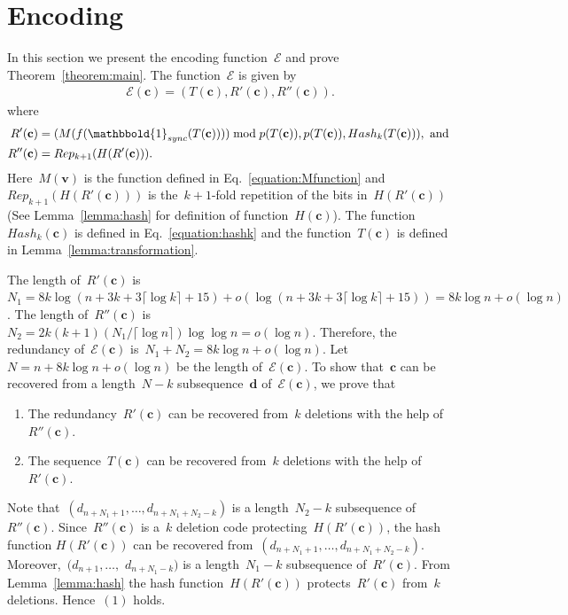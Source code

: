 \documentclass[10pt,a4paper,onecolumn]{IEEEtran}
\newcommand{\1}{\mathbbold{1}}
\newcommand{\boldc}{\mathbf{c}}
\newcommand{\boldd}{\mathbf{d}}
\newcommand{\boldv}{\mathbf{v}}
\begin{document}
\section{Encoding}\label{section:encoding}
In this section we present the encoding function~$\mathcal{E}$ and prove Theorem~\ref{theorem:main}.
The function~$\mathcal{E}$ is given by
\begin{align*}
    \mathcal{E}(\boldc) = (T(\boldc),R'(\boldc),R''(\boldc)).
\end{align*}
where 
\begin{align*}
   R'(\boldc)&=( M(f(\1_{sync}(T(\boldc)))) \bmod p(T(\boldc)),p(T(\boldc)),Hash_k(T(\boldc))), \text{ and }\\
   R''(\boldc)&=Rep_{k+1}(H(R'(\boldc))).
\end{align*}
Here~$M(\boldv)$ is the function defined in Eq.~\eqref{equation:Mfunction} and~$Rep_{k+1}(H(R'(\boldc)))$ is the~$k+1$-fold repetition of the bits in~$H(R'(\boldc))$ (See Lemma~\ref{lemma:hash} for definition of function~$H(\boldc)$). The function~$Hash_k(\boldc)$ is defined in Eq.~\eqref{equation:hashk} and the function~$T(\boldc)$ is defined in Lemma~\ref{lemma:transformation}.

The length of~$R'(\boldc)$ is~$N_1=8k\log (n+3k+3\lceil \log k\rceil +15)+o(\log (n+3k+3\lceil \log k\rceil +15))=8k\log n +o(\log n)$. The length of~$R''(\boldc)$ is~$N_2=2k(k+1)(N_1/\lceil \log n\rceil )\log \log n=o(\log n)$. 
Therefore, the redundancy of~$\mathcal{E}(\boldc)$ is~$N_1+N_2=8k\log n+o(\log n)$. 
Let~$N=n+8k\log n +o(\log n)$ be the length of~$\mathcal{E}(\boldc)$. To show that~$\boldc$ can be recovered from a length~$N-k$ subsequence~$\boldd$ of~$\mathcal{E}(\boldc)$, we prove that
\begin{enumerate}
    \item The redundancy~$R'(\boldc)$ can be recovered from~$k$ deletions with the help of~$R''(\boldc)$.
    \item The sequence~$T(\boldc)$ can be recovered from~$k$ deletions with the help of~$R'(\boldc)$.
\end{enumerate}
Note that~$(d_{n+N_1+1},\ldots,d_{n+N_1+N_2-k})$ is a length~$N_2-k$ subsequence of~$R''(\boldc)$. Since~$R''(\boldc)$ is a~$k$ deletion code protecting~$H(R'(\boldc))$, the hash function $H(R'(\boldc))$ can be recovered from~$(d_{n+N_1+1},\ldots,d_{n+N_1+N_2-k})$.
Moreover,~$(d_{n+1},\ldots,$ $d_{n+N_1-k})$ is a length~$N_1-k$ subsequence of~$R'(\boldc)$. From Lemma~\ref{lemma:hash} the hash function~$H(R'(\boldc))$ protects~$R'(\boldc)$ from~$k$ deletions. Hence~$(1)$ holds. 
\end{document}
